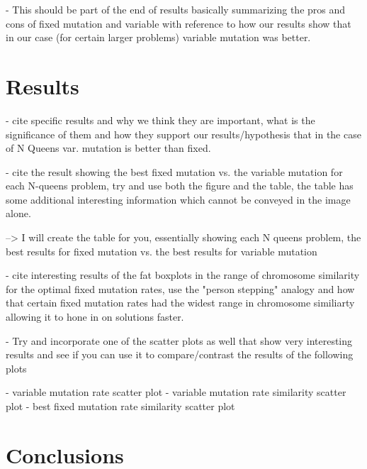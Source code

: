 \documentclass{sig-alternate}
\begin{document}
- This should be part of the end of results basically summarizing the pros
  and cons of fixed mutation and variable with reference to how our results
  show that in our case (for certain larger problems) variable mutation was better.




% 
%
\section{Results}

- cite specific results and why we think they are important, what is the significance
  of them and how they support our results/hypothesis that in the case of N Queens
  var. mutation is better than fixed.

- cite the result showing the best fixed mutation vs. the variable mutation
  for each N-queens problem, try and use both the figure and the table, the table
  has some additional interesting information which cannot be conveyed in the
  image alone.
  
  --> I will create the table for you, essentially showing each N queens problem, the
      best results for fixed mutation vs. the best results for variable mutation

- cite interesting results of the fat boxplots in the range of chromosome similarity
  for the optimal fixed mutation rates, use the "person stepping" analogy and how
  that certain fixed mutation rates had the widest range in chromosome similiarty
  allowing it to hone in on solutions faster.

- Try and incorporate one of the scatter plots as well that show very interesting
  results and see if you can use it to compare/contrast the results of the 
  following plots
  
    - variable mutation rate scatter plot
    - variable mutation rate similarity scatter plot
    - best fixed mutation rate similarity scatter plot




% 
%
\section{Conclusions}
\end{document}

